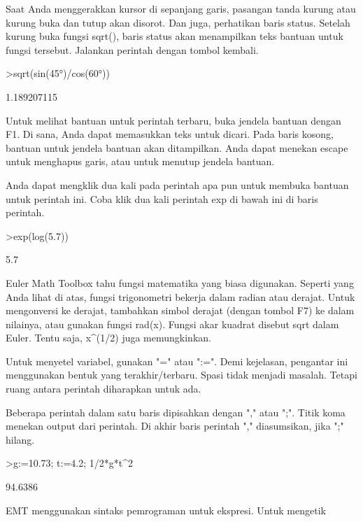 \documentclass[a4paper,10pt]{article}
\begin{document}
\begin{eulernotebook}
\begin{eulercomment}
\begin{eulercomment}
\begin{eulercomment}
Saat Anda menggerakkan kursor di sepanjang garis, pasangan tanda
kurung atau kurung buka dan tutup akan disorot. Dan juga, perhatikan
baris status. Setelah kurung buka fungsi sqrt(), baris status akan
menampilkan teks bantuan untuk fungsi tersebut. Jalankan perintah
dengan tombol kembali.
\end{eulercomment}
\begin{eulerprompt}
>sqrt(sin(45°)/cos(60°))
\end{eulerprompt}
\begin{euleroutput}
  1.189207115
\end{euleroutput}
\begin{eulercomment}
Untuk melihat bantuan untuk perintah terbaru, buka jendela bantuan
dengan F1. Di sana, Anda dapat memasukkan teks untuk dicari. Pada
baris kosong, bantuan untuk jendela bantuan akan ditampilkan. Anda
dapat menekan escape untuk menghapus garis, atau untuk menutup jendela
bantuan.

Anda dapat mengklik dua kali pada perintah apa pun untuk membuka
bantuan untuk perintah ini. Coba klik dua kali perintah exp di bawah
ini di baris perintah.
\end{eulercomment}
\begin{eulerprompt}
>exp(log(5.7))
\end{eulerprompt}
\begin{euleroutput}
  5.7
\end{euleroutput}
\begin{eulercomment}
\end{eulercomment}
\begin{eulercomment}
Euler Math Toolbox tahu fungsi matematika yang biasa digunakan.
Seperti yang Anda lihat di atas, fungsi trigonometri bekerja dalam
radian atau derajat. Untuk mengonversi ke derajat, tambahkan simbol
derajat (dengan tombol F7) ke dalam nilainya, atau gunakan fungsi
rad(x). Fungsi akar kuadrat disebut sqrt dalam Euler. Tentu saja,
x\textasciicircum{}(1/2) juga memungkinkan.

Untuk menyetel variabel, gunakan "=" atau ":=". Demi kejelasan,
pengantar ini menggunakan bentuk yang terakhir/terbaru. Spasi tidak
menjadi masalah. Tetapi ruang antara perintah diharapkan untuk ada.

Beberapa perintah dalam satu baris dipisahkan dengan "," atau ";".
Titik koma menekan output dari perintah. Di akhir baris perintah ","
diasumsikan, jika ";" hilang.
\end{eulercomment}
\begin{eulerprompt}
>g:=10.73; t:=4.2; 1/2*g*t^2
\end{eulerprompt}
\begin{euleroutput}
  94.6386
\end{euleroutput}
\begin{eulercomment}
EMT menggunakan sintaks pemrograman untuk ekspresi. Untuk mengetik


\end{eulercomment}
\end{eulercomment}
\end{eulercomment}
\end{eulernotebook}
\end{document}
